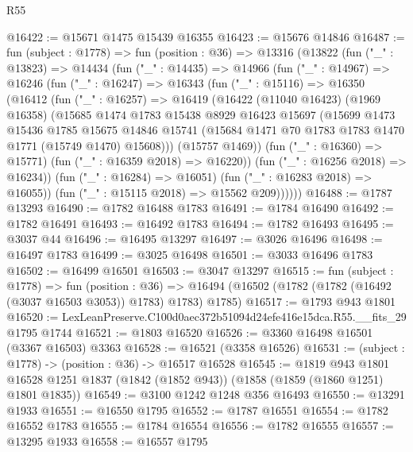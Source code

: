\begin{lexlean}{R55}
\begin{coremodule}
@16422 := @15671 @1475 @15439 @16355
@16423 := @15676 @14846
@16487 := fun (subject : @1778) =>
  fun (position : @36) =>
  @13316
    (@13822
      (fun ("_" : @13823) =>
      @14434
        (fun ("_" : @14435) =>
        @14966
          (fun ("_" : @14967) =>
          @16246
            (fun ("_" : @16247) =>
            @16343
              (fun ("_" : @15116) =>
              @16350
                (@16412
                  (fun ("_" : @16257) =>
                  @16419
                    (@16422
                      (@11040 @16423)
                      (@1969 @16358)
                      (@15685
                        @1474
                        @1783
                        @15438
                        @8929
                        @16423
                        @15697
                        (@15699
                          @1473
                          @15436
                          @1785
                          @15675
                          @14846
                          @15741
                          (@15684 @1471 @70 @1783 @1783 @1470 @1771 (@15749 @1470) @15608)))
                      (@15757 @1469))
                    (fun ("_" : @16360) => @15771)
                    (fun ("_" : @16359 @2018) => @16220))
                  (fun ("_" : @16256 @2018) => @16234))
                (fun ("_" : @16284) => @16051)
                (fun ("_" : @16283 @2018) => @16055))
              (fun ("_" : @15115 @2018) => @15562 @209))))))
@16488 := @1787 @13293
@16490 := @1782 @16488 @1783
@16491 := @1784 @16490
@16492 := @1782 @16491
@16493 := @16492 @1783
@16494 := @1782 @16493
@16495 := @3037 @44
@16496 := @16495 @13297
@16497 := @3026 @16496
@16498 := @16497 @1783
@16499 := @3025 @16498
@16501 := @3033 @16496 @1783
@16502 := @16499 @16501
@16503 := @3047 @13297
@16515 := fun (subject : @1778) =>
  fun (position : @36) =>
  @16494 (@16502 (@1782 (@1782 (@16492 (@3037 @16503 @3053)) @1783) @1783) @1785)
@16517 := @1793 @943 @1801
@16520 := LexLeanPreserve.C100d0aec372b51094d24efe416e15dca.R55.__fits_29 @1795 @1744
@16521 := @1803 @16520
@16526 := @3360 @16498 @16501 (@3367 @16503) @3363
@16528 := @16521 (@3358 @16526)
@16531 := (subject : @1778) -> (position : @36) -> @16517 @16528
@16545 := @1819
    @943
    @1801
    @16528
    @1251
    @1837
    (@1842 (@1852 @943))
    (@1858 (@1859 (@1860 @1251) @1801 @1835))
@16549 := @3100 @1242 @1248 @356 @16493
@16550 := @13291 @1933
@16551 := @16550 @1795
@16552 := @1787 @16551
@16554 := @1782 @16552 @1783
@16555 := @1784 @16554
@16556 := @1782 @16555
@16557 := @13295 @1933
@16558 := @16557 @1795

\end{coremodule}
\end{lexlean}
